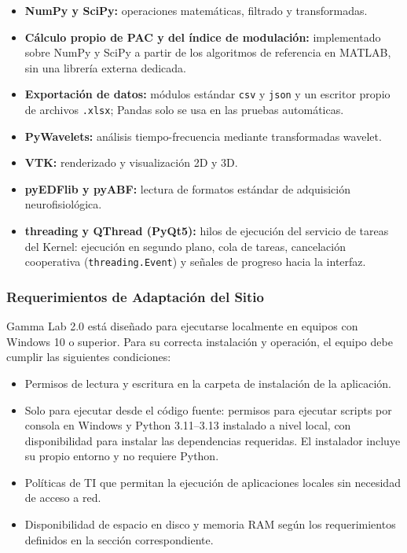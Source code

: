 \documentclass[12pt, letterpaper]{article}
\begin{document}
\begin{itemize}

    \item \textbf{NumPy y SciPy:} operaciones matemáticas, filtrado y
    transformadas.

    \item \textbf{Cálculo propio de PAC y del índice de modulación:}
    implementado sobre NumPy y SciPy a partir de los algoritmos de referencia
    en MATLAB, sin una librería externa dedicada.

    \item \textbf{Exportación de datos:} módulos estándar \texttt{csv} y
    \texttt{json} y un escritor propio de archivos \texttt{.xlsx}; Pandas solo
    se usa en las pruebas automáticas.

    \item \textbf{PyWavelets:} análisis tiempo-frecuencia mediante
    transformadas wavelet.

    \item \textbf{VTK:} renderizado y visualización 2D y 3D.

    \item \textbf{pyEDFlib y pyABF:} lectura de formatos estándar de
    adquisición neurofisiológica.

    \item \textbf{threading y QThread (PyQt5):} hilos de ejecución del
    servicio de tareas del Kernel: ejecución en segundo plano, cola de tareas,
    cancelación cooperativa (\texttt{threading.Event}) y señales de progreso
    hacia la interfaz.

\end{itemize}

\subsubsection{Requerimientos de Adaptación del Sitio}

Gamma Lab 2.0 está diseñado para ejecutarse localmente en equipos con
Windows 10 o superior. Para su correcta instalación y operación, el equipo
debe cumplir las siguientes condiciones:

\begin{itemize}

    \item Permisos de lectura y escritura en la carpeta de instalación de
    la aplicación.

    \item Solo para ejecutar desde el código fuente: permisos para ejecutar
    scripts por consola en Windows y Python 3.11--3.13 instalado a nivel
    local, con disponibilidad para instalar las dependencias requeridas. El
    instalador incluye su propio entorno y no requiere Python.

    \item Políticas de TI que permitan la ejecución de aplicaciones locales
    sin necesidad de acceso a red.

    \item Disponibilidad de espacio en disco y memoria RAM según los
    requerimientos definidos en la sección correspondiente.

\end{itemize}
\end{document}
